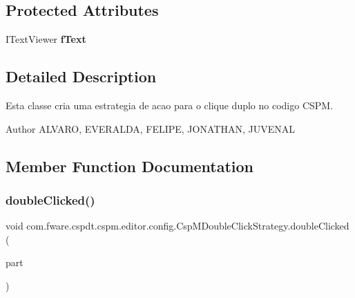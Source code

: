 \subsection*{Protected Attributes}
\begin{DoxyCompactItemize}
\item 
\mbox{\label{classcom_1_1fware_1_1cspdt_1_1cspm_1_1editor_1_1config_1_1_csp_m_double_click_strategy_ae198a896bfb74826e91d029255703f30}} 
I\+Text\+Viewer {\bfseries f\+Text}
\end{DoxyCompactItemize}


\subsection{Detailed Description}
Esta classe cria uma estrategia de acao para o clique duplo no codigo C\+S\+PM. 

\begin{DoxyAuthor}{Author}
A\+L\+V\+A\+RO, E\+V\+E\+R\+A\+L\+DA, F\+E\+L\+I\+PE, J\+O\+N\+A\+T\+H\+AN, J\+U\+V\+E\+N\+AL 
\end{DoxyAuthor}


\subsection{Member Function Documentation}
\mbox{\label{classcom_1_1fware_1_1cspdt_1_1cspm_1_1editor_1_1config_1_1_csp_m_double_click_strategy_a0e4b88b8359d976abf366b46705eb55c}} 
\subsubsection{\texorpdfstring{double\+Clicked()}{doubleClicked()}}
{\footnotesize\ttfamily void com.\+fware.\+cspdt.\+cspm.\+editor.\+config.\+Csp\+M\+Double\+Click\+Strategy.\+double\+Clicked (\begin{DoxyParamCaption}\item[{I\+Text\+Viewer}]{part }\end{DoxyParamCaption})\hspace{0.3cm}{\ttfamily [inline]}}



